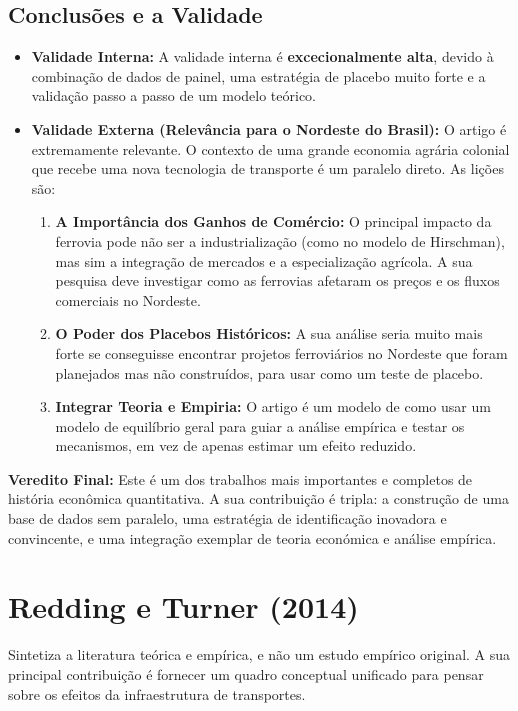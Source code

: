 \documentclass[12pt, a4paper]{article}
\begin{document}
\subsection{Conclusões e a Validade}
\begin{itemize}
    \item \textbf{Validade Interna:} A validade interna é \textbf{excecionalmente alta}, devido à combinação de dados de painel, uma estratégia de placebo muito forte e a validação passo a passo de um modelo teórico.
    \item \textbf{Validade Externa (Relevância para o Nordeste do Brasil):} O artigo é extremamente relevante. O contexto de uma grande economia agrária colonial que recebe uma nova tecnologia de transporte é um paralelo direto. As lições são:
        \begin{enumerate}
            \item \textbf{A Importância dos Ganhos de Comércio:} O principal impacto da ferrovia pode não ser a industrialização (como no modelo de Hirschman), mas sim a integração de mercados e a especialização agrícola. A sua pesquisa deve investigar como as ferrovias afetaram os preços e os fluxos comerciais no Nordeste.
            \item \textbf{O Poder dos Placebos Históricos:} A sua análise seria muito mais forte se conseguisse encontrar projetos ferroviários no Nordeste que foram planejados mas não construídos, para usar como um teste de placebo.
            \item \textbf{Integrar Teoria e Empiria:} O artigo é um modelo de como usar um modelo de equilíbrio geral para guiar a análise empírica e testar os mecanismos, em vez de apenas estimar um efeito reduzido.
        \end{enumerate}
\end{itemize}

\noindent\textbf{Veredito Final:} Este é um dos trabalhos mais importantes e completos de história econômica quantitativa. A sua contribuição é tripla: a construção de uma base de dados sem paralelo, uma estratégia de identificação inovadora e convincente, e uma integração exemplar de teoria económica e análise empírica. 

\section{Redding e Turner (2014)}
Sintetiza a literatura teórica e empírica, e não um estudo empírico original. A sua principal contribuição é fornecer um quadro conceptual unificado para pensar sobre os efeitos da infraestrutura de transportes.
\end{document}
